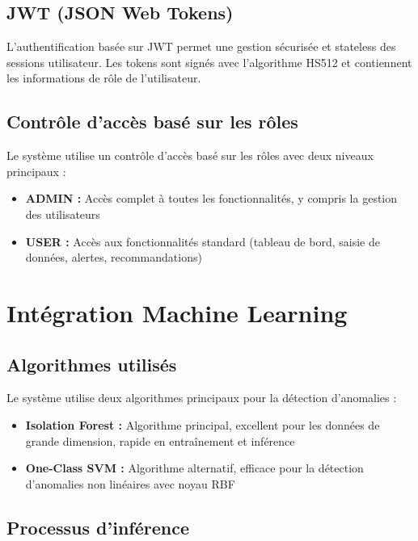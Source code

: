 \subsection{JWT (JSON Web Tokens)}

L'authentification basée sur JWT permet une gestion sécurisée et stateless des sessions utilisateur. Les tokens sont signés avec l'algorithme HS512 et contiennent les informations de rôle de l'utilisateur.

\subsection{Contrôle d'accès basé sur les rôles}

Le système utilise un contrôle d'accès basé sur les rôles avec deux niveaux principaux :
\begin{itemize}
    \item \textbf{ADMIN :} Accès complet à toutes les fonctionnalités, y compris la gestion des utilisateurs
    \item \textbf{USER :} Accès aux fonctionnalités standard (tableau de bord, saisie de données, alertes, recommandations)
\end{itemize}

\section{Intégration Machine Learning}

\subsection{Algorithmes utilisés}

Le système utilise deux algorithmes principaux pour la détection d'anomalies :

\begin{itemize}
    \item \textbf{Isolation Forest :} Algorithme principal, excellent pour les données de grande dimension, rapide en entraînement et inférence
    \item \textbf{One-Class SVM :} Algorithme alternatif, efficace pour la détection d'anomalies non linéaires avec noyau RBF
\end{itemize}

\subsection{Processus d'inférence}

